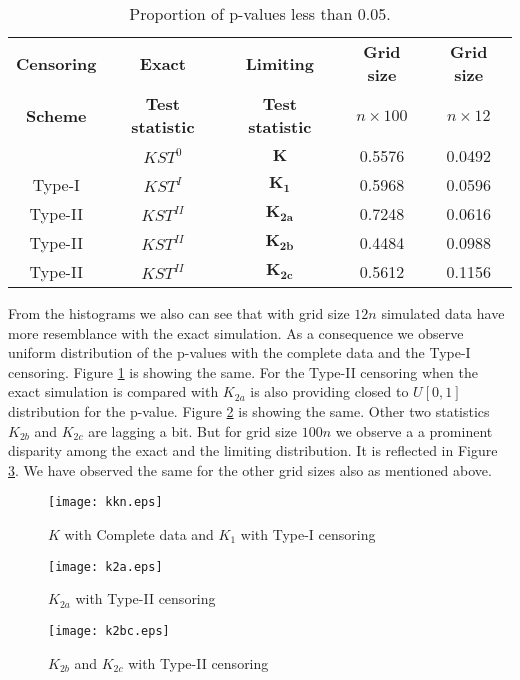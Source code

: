 \documentclass[12pt, reqno]{amsart}
\begin{document}
\begin{table}[t]
  \begin{tabular}{|c|c|c|c|c|}
  \hline
\textbf{Censoring} & \textbf{Exact} & \textbf{Limiting}  & \textbf{Grid size}  &  \textbf{Grid size} \\
 \textbf{Scheme} &\textbf{Test statistic}&  \textbf{Test statistic}  &  $ n \times 100$  & $n \times 12$   \\ 
   \hline
&$KST^0$&$\mathbf{K}$	    &	0.5576	&	0.0492  \\
Type-I& $KST^I$ &$\mathbf{K_1}$	    &	0.5968	&   0.0596	\\
Type-II& $KST^{II}$&$\mathbf{K_{2a}}$	&	0.7248	&	0.0616	\\
Type-II&$KST^{II}$&$\mathbf{K_{2b}}$	&	0.4484	&	0.0988	\\
Type-II&$KST^{II}$&$\mathbf{K_{2c}}$	&	0.5612	&	0.1156	\\
\hline 
\end{tabular}
\vspace{0.5cm}
\caption{Proportion of p-values less than 0.05.} \label{pvalue_compare}
 \end{table}
 
From the histograms we also can see that with grid size $12n$  simulated data have more resemblance with the exact simulation. As a consequence we observe uniform distribution of the p-values with  the complete data and the Type-I censoring. Figure \ref{fig:K01}  is showing the same. 
For the Type-II censoring when the exact simulation is  compared  with $K_{2a}$ is also providing closed to  $U[0,1]$ distribution for the p-value. Figure \ref{fig:K2a}  is showing the same. Other two statistics  $K_{2b}$ and $K_{2c}$ are lagging a bit.  But for grid size $100n$  we observe a a prominent disparity  among the exact and the limiting distribution.  It is reflected in Figure \ref{fig:K2bc}. We have observed the same for the other grid sizes also as mentioned above.
\newpage
\begin{figure}[t]
	\texttt{[image: kkn.eps]}
	\caption{$K$ with Complete data and $K_1$ with Type-I censoring}
	\label{fig:K01}
\end{figure}

\begin{figure}[h]
	\texttt{[image: k2a.eps]}
	\caption{$K_{2a}$ with Type-II censoring   }
	\label{fig:K2a}
\end{figure}

\begin{figure}[h]
	\texttt{[image: k2bc.eps]}
	\caption{$K_{2b}$ and $K_{2c}$ with Type-II censoring }
	\label{fig:K2bc}
\end{figure}
\newpage
\end{document}

